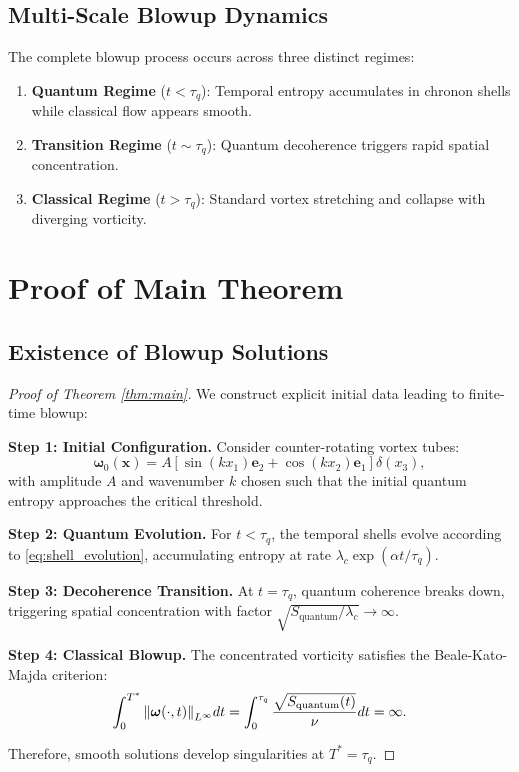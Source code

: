 \documentclass[11pt,a4paper]{article}
\theoremstyle{definition}
\begin{document}
\subsection{Multi-Scale Blowup Dynamics}

The complete blowup process occurs across three distinct regimes:

\begin{enumerate}
\item \textbf{Quantum Regime} ($t < \tau_q$): Temporal entropy accumulates in chronon shells while classical flow appears smooth.

\item \textbf{Transition Regime} ($t \sim \tau_q$): Quantum decoherence triggers rapid spatial concentration.

\item \textbf{Classical Regime} ($t > \tau_q$): Standard vortex stretching and collapse with diverging vorticity.
\end{enumerate}

\section{Proof of Main Theorem}

\subsection{Existence of Blowup Solutions}

\begin{proof}[Proof of Theorem \ref{thm:main}]
We construct explicit initial data leading to finite-time blowup:

\textbf{Step 1: Initial Configuration.} Consider counter-rotating vortex tubes:
\begin{equation}
\boldsymbol{\omega}_0(\mathbf{x}) = A\left[\sin(kx_1)\mathbf{e}_2 + \cos(kx_2)\mathbf{e}_1\right]\delta(x_3),
\end{equation}
with amplitude $A$ and wavenumber $k$ chosen such that the initial quantum entropy approaches the critical threshold.

\textbf{Step 2: Quantum Evolution.} For $t < \tau_q$, the temporal shells evolve according to \eqref{eq:shell_evolution}, accumulating entropy at rate $\lambda_c \exp(\alpha t/\tau_q)$.

\textbf{Step 3: Decoherence Transition.} At $t = \tau_q$, quantum coherence breaks down, triggering spatial concentration with factor $\sqrt{S_{\text{quantum}}/\lambda_c} \to \infty$.

\textbf{Step 4: Classical Blowup.} The concentrated vorticity satisfies the Beale-Kato-Majda criterion:
\begin{equation}
\int_0^{T^*} \norm{\boldsymbol{\omega}(\cdot, t)}_{L^\infty} dt = \int_0^{\tau_q} \frac{\sqrt{S_{\text{quantum}}(t)}}{\nu} dt = \infty.
\end{equation}

Therefore, smooth solutions develop singularities at $T^* = \tau_q$.
\end{proof}
\end{document}
